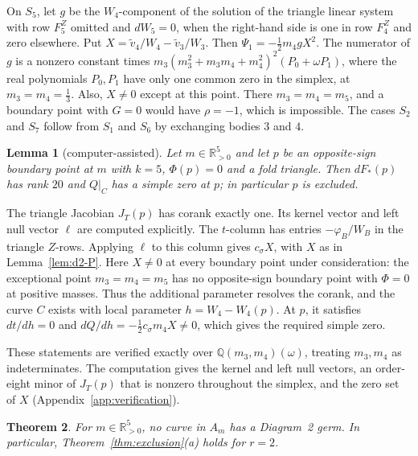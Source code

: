 \documentclass[Threeside,11pt]{article}
\newtheorem{theorem}{Theorem}[section]
\newtheorem{lemma}[theorem]{Lemma}
\theoremstyle{definition}
\theoremstyle{remark}
\numberwithin{equation}{section}
\theoremstyle{remark}
\newcommand{\Rp}{\mathbb{R}_{>0}}
\begin{document}
{On $S_5$, let $g$ be the $W_4$-component of the solution of the
triangle linear system with row $F^Z_5$ omitted and $dW_5=0$, when the right-hand side is
one in row $F^Z_4$ and zero elsewhere.  Put $X=\tilde v_4/W_4-\tilde v_3/W_3$.
Then $\Psi_1=-\frac12m_4gX^2$.
The numerator of $g$ is a nonzero constant times
$m_3(m_3^2+m_3m_4+m_4^2)^2(P_0+\omega P_1)$, where the real polynomials $P_0,P_1$ have
only one common zero in the simplex, at $m_3=m_4=\frac13$.
Also, $X\ne0$ except at this point.
There $m_3=m_4=m_5$, and a boundary point with $G=0$ would have $\rho=-1$, which is impossible.
The cases $S_2$ and $S_7$ follow from $S_1$ and $S_6$ by exchanging bodies $3$ and $4$.}

\begin{lemma}[computer-assisted]\label{lem:d2-fold}
Let $m\in\Rp^5$ and let $p$ be an opposite-sign boundary point at $m$ with $k=5$, $\Phi(p)=0$ and a
fold triangle.  Then $dF_*(p)$ has rank $20$ and $Q|_C$ has a simple zero at $p$; in
particular $p$ is excluded.
\end{lemma}

{The triangle Jacobian $J_T(p)$ has corank exactly one.
Its kernel vector and left null vector $\ell$ are computed explicitly.
The $t$-column has entries $-\varphi_B/W_B$ in the triangle $Z$-rows.
Applying $\ell$ to this column gives $c_\sigma X$, with $X$ as in
Lemma~\ref{lem:d2-P}.
Here $X\ne0$ at every boundary point under consideration: the exceptional point $m_3=m_4=m_5$
has no opposite-sign boundary point with $\Phi=0$ at positive masses.
Thus the additional parameter resolves the corank, and the curve $C$ exists with local
parameter $h=W_4-W_4(p)$.
At $p$, it satisfies $dt/dh=0$ and $dQ/dh=-\frac12c_\sigma m_4X\ne0$, which gives the
required simple zero.

These statements are verified exactly over $\mathbb Q(m_3,m_4)(\omega)$, treating
$m_3,m_4$ as indeterminates.
The computation gives the kernel and left null vectors, an order-eight minor of
$J_T(p)$ that is nonzero throughout the simplex, and the zero set of $X$
(Appendix~\ref{app:verification}).}

\begin{theorem}\label{thm:d2}
{For $m\in\Rp^5$, no curve in $A_m$ has a Diagram~2 germ.
In particular, Theorem~\ref{thm:exclusion}\textup{(a)} holds for $r=2$.}
\end{theorem}
\end{document}
